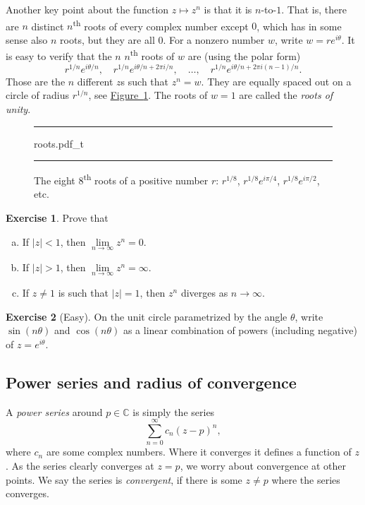 \documentclass[12pt,openany]{book}
\newcommand{\sabs}[1]{\lvert {#1} \rvert}
\newcommand{\C}{{\mathbb{C}}}
\newcommand{\myindex}[1]{#1\index{#1}}
\theoremstyle{plain}
\theoremstyle{remark}
\theoremstyle{definition}
\newenvironment{exbox}{%
    \def\FrameCommand{\vrule width 1pt \relax\hspace{10pt}}%
    \MakeFramed{\advance\hsize-\width\FrameRestore}%
}{%
    \endMakeFramed
}
\newenvironment{exparts}{%
    \leavevmode\begin{enumerate}[a),noitemsep,topsep=0pt,parsep=0pt,partopsep=0pt]
}{%
    \end{enumerate}
}
\newenvironment{myfig}{%
\begin{figure}[h!t]
\noindent\rule{\textwidth}{0.5pt}\vspace{12pt}\par\centering}%
{\par\noindent\rule{\textwidth}{0.5pt}
\end{figure}}
\theoremstyle{exercise}
\newtheorem{exercise}{Exercise}[section]
\theoremstyle{example}
\newcommand{\figureref}[1]{\hyperref[#1]{Figure~\ref*{#1}}}
\begin{document}
Another key point about the function $z \mapsto z^n$ is that it is $n$-to-$1$.
That is, there are $n$ distinct $n$\textsuperscript{th} roots of every complex
number except $0$,
which has in some sense also $n$ roots, but they are all $0$.  For a nonzero
number $w$, write $w = re^{i\theta}$.  It is easy to verify that
the $n$ $n$\textsuperscript{th} roots of $w$ are 
(using the polar form)
\begin{equation*}
r^{1/n} e^{i\theta/n}
, \quad
r^{1/n} e^{i\theta/n + 2\pi i /n}
, \quad \ldots, \quad
r^{1/n} e^{i\theta/n + 2\pi i (n-1)/n} .
\end{equation*}
Those are the $n$ different $z$s such that $z^n=w$.  They are equally
spaced out on a circle of radius $r^{1/n}$, see
\figureref{fig:roots}.  The roots of $w=1$ are
called the \emph{\myindex{roots of unity}}.

\begin{myfig}
{roots.pdf_t}
\caption{The eight $8$\textsuperscript{th} roots of a positive number $r$:
$r^{1/8}$, $r^{1/8} e^{i \pi / 4}$,  $r^{1/8} e^{i \pi / 2}$,
etc.\label{fig:roots}}
\end{myfig}

\begin{exbox}
\begin{exercise}
Prove that
\begin{exparts}
\item
If $\sabs{z}<1$, then $\lim\limits_{n\to \infty} z^n = 0$.
\item
If $\sabs{z}>1$, then $\lim\limits_{n\to \infty} z^n = \infty$.
\item
If $z \not= 1$ is such that $\sabs{z}=1$, then $z^n$ diverges as $n \to
\infty$.
\end{exparts}
\end{exercise}

\begin{exercise}[Easy]
On the unit circle parametrized by the angle $\theta$,
write $\sin(n\theta)$ and $\cos(n\theta)$ as a linear combination
of powers (including negative) of $z = e^{i\theta}$.
\end{exercise}
\end{exbox}

\subsection{Power series and radius of convergence}

A \emph{\myindex{power series}} around $p \in \C$ is simply the series
%
\begin{equation*}
\sum_{n=0}^\infty c_n {(z-p)}^n ,
\end{equation*}
where $c_n$ are some complex numbers.  Where it converges it defines a
function of $z$.  As the series clearly converges at $z=p$, we worry about
convergence at other points.  We say the series is
\emph{convergent}, if there is
some $z \not= p$ where the series converges.
\end{document}
